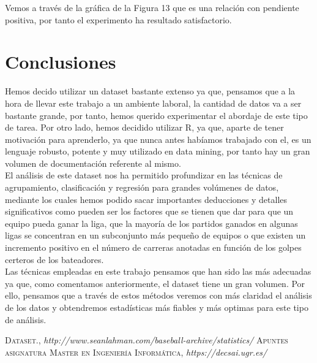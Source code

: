 \documentclass[10pt]{article}
\begin{document}
Vemos a través de la gráfica de la Figura 13 que es una relación con pendiente positiva, por tanto el experimento ha resultado satisfactorio.\\


\section{Conclusiones}

Hemos decido utilizar un dataset bastante extenso ya que, pensamos que a la hora de llevar este trabajo a un ambiente laboral, la cantidad de datos va a ser bastante grande, por tanto, hemos querido experimentar el abordaje de este tipo de tarea.  Por otro lado, hemos decidido utilizar R, ya que, aparte de tener motivación para aprenderlo, ya que nunca antes habíamos trabajado con el, es un lenguaje robusto, potente y muy utilizado en data mining, por tanto hay un gran volumen de documentación referente al mismo. \\

El análisis de este dataset nos ha permitido profundizar en las técnicas de agrupamiento, clasificación y regresión para grandes volúmenes de datos, mediante los cuales hemos podido sacar importantes deducciones y detalles significativos como pueden ser los factores que se tienen que dar para que un equipo pueda ganar la liga, que la mayoría de los partidos ganados en algunas ligas se concentran en un subconjunto más pequeño de equipos o que existen un incremento positivo en el número de carreras anotadas en función de los golpes certeros de los bateadores.\\

Las técnicas empleadas en este trabajo pensamos que han sido las más adecuadas ya que, como comentamos anteriormente, el dataset tiene un gran volumen. Por ello, pensamos que a través de estos métodos veremos con más claridad el análisis de los datos y obtendremos estadísticas más fiables y más optimas para este tipo de análisis.\\

\begin{thebibliography}{a}
 \textsc{Dataset.},
\textit{http://www.seanlahman.com/baseball-archive/statistics/}
 \textsc{Apuntes asignatura Master en Ingeniería Informática},
\textit{https://decsai.ugr.es/}
\end{thebibliography}
\end{document}
